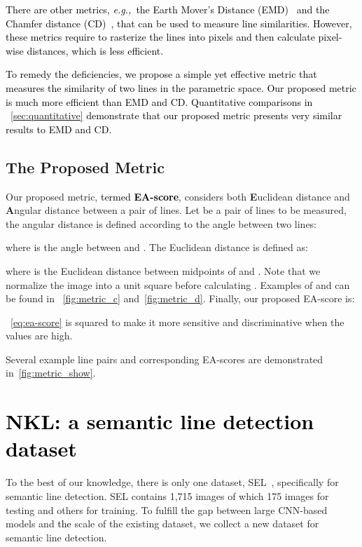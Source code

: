 \documentclass[10pt,journal,cspaper,compsoc]{IEEEtran}
\newcommand{\revise}[1]{{\textcolor{black}{#1}}}
\newcommand{\rerevise}[1]{{\textcolor{black}{#1}}}
\newcommand{\CheckRmv}[1]{}
\newcommand{\CheckRmv}[1]{#1}
\def\eg{\emph{e.g.,~}}
\begin{document}
\rerevise{There are other metrics,
\eg the Earth Mover's Distance (EMD)~\cite{rubner2000earth}
and the Chamfer distance (CD)~\cite{borgefors1986distance},
that can be used to measure line similarities.
However, these metrics require to rasterize the lines into pixels
and then calculate pixel-wise distances, which is less efficient.
}

\rerevise{
To remedy the deficiencies,
we propose a simple yet effective metric that measures the similarity 
of two lines in the parametric space.
Our proposed metric is much more efficient than EMD and CD.
Quantitative comparisons in ~\cref{sec:quantitative} demonstrate that 
our proposed metric presents very similar results to EMD and CD.}


\CheckRmv{
\begin{figure*}[!htb]
  \centering
  \begin{overpic}[width=1\linewidth]{figures/dataset_vis.jpg}
  \end{overpic}\vspace{-8pt}
  \caption{
    Example images and annotations (yellow lines) of \revise{NKL}.
Images of \revise{NKL} present diverse scenes and rich line annotations.
  }
  \label{fig:dataset_vis}
\end{figure*}
}

\subsection{The Proposed Metric}
Our proposed metric, \revise{termed \textbf{EA-score}}, considers both 
\textbf{E}uclidean distance and \textbf{A}ngular distance
between a pair of lines.
Let  be a pair of lines to be measured,
the angular distance  is defined according to the
angle between two lines:

where  is the angle between  and .
The Euclidean distance is defined as:

where  is the Euclidean distance between midpoints of  and .
Note that we normalize the image into a unit square before calculating .
Examples of  and  can be found in
~\cref{fig:metric_c} and~\cref{fig:metric_d}.
Finally, our proposed EA-score is:

~\cref{eq:ea-score} is squared to make it more sensitive and discriminative
when the values are high.

Several example line pairs and corresponding EA-scores
are demonstrated in~\cref{fig:metric_show}.

\section{\revise{NKL: a semantic line detection dataset}}\label{sec:nkl-dataset}
To the best of our knowledge, there is only one dataset, SEL~\cite{lee2017semantic},
specifically for semantic line detection.
SEL contains 1,715 images of which 175 images for testing
and others for training.
To fulfill the gap between large CNN-based models and \revise{the} scale of the existing
dataset,
we collect a new dataset for semantic line detection.
\end{document}
